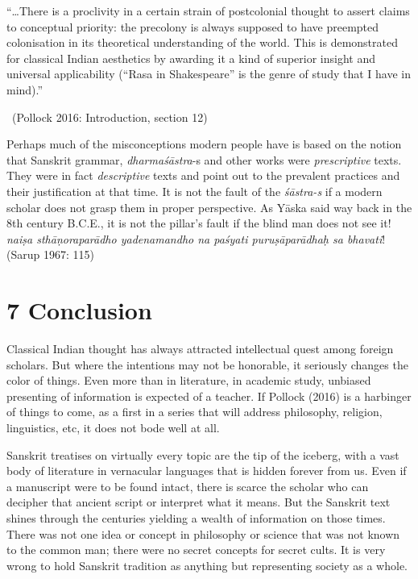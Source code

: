 \begin{myquote}
“…There is a proclivity in a certain strain of postcolonial thought to assert claims to conceptual priority: the precolony is always supposed to have preempted colonisation in its theoretical understanding of the world. This is demonstrated for classical Indian aesthetics by awarding it a kind of superior insight and universal applicability (“Rasa in Shakespeare” is the genre of study that I have in mind).” 

~\hfill (Pollock 2016: Introduction, section 12)
\end{myquote}

Perhaps much of the misconceptions modern people have is based on the notion that Sanskrit grammar, \textit{dharmaśāstra}-s and other works were \textit{prescriptive} texts. They were in fact \textit{descriptive} texts and point out to the prevalent practices and their justification at that time. It is not the fault of the \textit{śāstra-s} if a modern scholar does not grasp them in proper perspective. As Yāska said way back in the 8th century B.C.E., it is not the pillar’s fault if the blind man does not see it! \textit{naiṣa sthāṇoraparādho yadenamandho na paśyati  puruṣāparādhaḥ sa bhavati}! (Sarup 1967: 115)


\section*{7 Conclusion}

Classical Indian thought has always attracted intellectual quest among foreign scholars. But where the intentions may not be honorable, it seriously changes the color of things. Even more than in literature, in academic study, unbiased presenting of information is expected of a teacher. If Pollock (2016) is a harbinger of things to come, as a first in a series that will address philosophy, religion, linguistics, etc, it does not bode well at all.

Sanskrit treatises on virtually every topic are the tip of the iceberg, with a vast body of literature in vernacular languages that is hidden forever from us. Even if a manuscript were to be found intact, there is scarce the scholar who can decipher that ancient script or interpret what it means. But the Sanskrit text shines through the centuries yielding a wealth of information on those times. There was not one idea or concept in philosophy or science that was not known to the common man; there were no secret concepts for secret cults. It is very wrong to hold Sanskrit tradition as anything but representing society as a whole.


